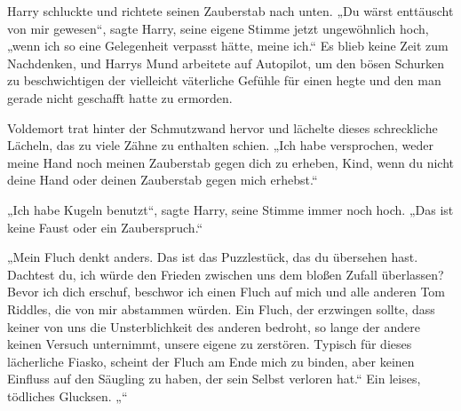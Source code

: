 Harry schluckte und richtete seinen Zauberstab nach unten.
„Du wärst enttäuscht von mir gewesen“, sagte Harry, seine eigene Stimme jetzt ungewöhnlich hoch, „wenn ich so eine Gelegenheit verpasst hätte, meine ich.“
Es blieb keine Zeit zum Nachdenken, und Harrys Mund arbeitete auf Autopilot, um den bösen Schurken zu beschwichtigen der vielleicht väterliche Gefühle für einen hegte und den man gerade nicht geschafft hatte zu ermorden.

Voldemort trat hinter der Schmutzwand hervor und lächelte dieses schreckliche Lächeln, das zu viele Zähne zu enthalten schien.
„Ich habe versprochen, weder meine Hand noch meinen Zauberstab gegen dich zu erheben, Kind, wenn du nicht deine Hand oder deinen Zauberstab gegen mich erhebst.“

„Ich habe Kugeln benutzt“, sagte Harry, seine Stimme immer noch hoch.
„Das ist keine Faust oder ein Zauberspruch.“

„Mein Fluch denkt anders. Das ist das Puzzlestück, das du übersehen hast. Dachtest du, ich würde den Frieden zwischen uns dem bloßen Zufall überlassen? Bevor ich dich erschuf, beschwor ich einen Fluch auf mich und alle anderen Tom Riddles, die von mir abstammen würden. Ein Fluch, der erzwingen sollte, dass keiner von uns die Unsterblichkeit des anderen bedroht, so lange der andere keinen Versuch unternimmt, unsere eigene zu zerstören. Typisch für dieses lächerliche Fiasko, scheint der Fluch am Ende mich zu binden, aber keinen Einfluss auf den Säugling zu haben, der sein Selbst verloren hat.“
Ein leises, tödliches Glucksen.
„“

